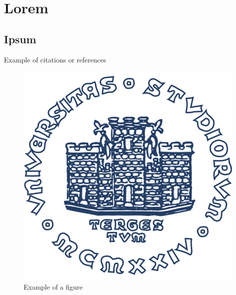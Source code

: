 \chapter{Lorem}\label{chap:lorem}

\section{Ipsum}

Example of citations or references~\cite{einstein}\cite{latexcompanion}

\begin{figure}[h!]\label{fig:example}
\centering
\includegraphics[width=.8\textwidth]{img/units_logo.png}
\caption{Example of a figure}
\end{figure}

\lipsum[3]

